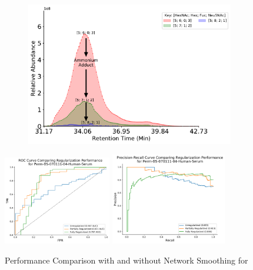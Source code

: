 \begin{figure}[!htb]
\begin{minipage}{0.45\linewidth}
            \begin{subfigure}[t]{\linewidth}
                \includegraphics[width=0.75\linewidth, valign=t]{figure/ammonium_adduct_ambiguity.pdf}
            \end{subfigure}
        \end{minipage}
    \end{figure}

    \begin{figure}[htb]
        \caption{Performance Comparison with and without Network Smoothing for \rpserum
                 \label{fig:rpserum_perf}}
        \centering
        \includegraphics[width=0.42\textwidth,valign=t]{figure/serum_roc.pdf}
        \includegraphics[width=0.45\textwidth,valign=t]{figure/serum_prec_rec.pdf}
    \end{figure}


